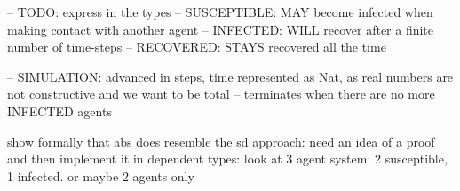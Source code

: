 -- TODO: express in the types
-- SUSCEPTIBLE: MAY become infected when making contact with another agent
-- INFECTED:    WILL recover after a finite number of time-steps
-- RECOVERED:   STAYS recovered all the time

-- SIMULATION:  advanced in steps, time represented as Nat, as real numbers are not constructive and we want to be total
--              terminates when there are no more INFECTED agents


show formally that abs does resemble the sd approach: need an idea of a proof and then implement it in dependent types: look at 3 agent system: 2 susceptible, 1 infected. or maybe 2 agents only

%
%
%
%

